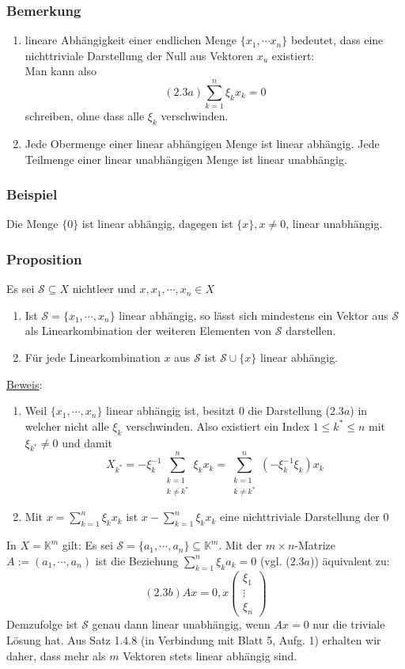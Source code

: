 \subsubsection{Bemerkung}
\renewcommand{\labelenumi}{(\arabic{enumi})}
\begin{enumerate}
\item lineare Abhängigkeit einer endlichen Menge $\{x_1,\cdots x_n\}$ bedeutet, dass eine nichttriviale Darstellung der Null aus Vektoren $x_u$ existiert:\\
Man kann also
\[(2.3a) \sum_{k=1}^n \xi _kx_k = 0\]
schreiben, ohne dass alle $\xi _k$ verschwinden.
\item Jede Obermenge einer linear abhängigen Menge ist linear abhängig.  Jede Teilmenge einer linear unabhängigen Menge ist linear unabhängig.
\end{enumerate}
\subsubsection{Beispiel}
Die Menge $\{0\}$ ist linear abhängig, dagegen ist $\{x\},x\not= 0$, linear unabhängig.
\subsubsection{Proposition}
Es sei $\mathcal{S}\subseteq X$ nichtleer und $x,x_1,\cdots ,x_n \in X$
\renewcommand{\labelenumi}{(\alph{enumi})}
\begin{enumerate}
\item Ist $\mathcal{S}=\{x_1, \cdots ,x_n\}$ linear abhängig, so lässt sich mindestens ein Vektor aus $\mathcal{S}$ als Linearkombination der weiteren Elementen von $\mathcal{S}$ darstellen.
\item Für jede Linearkombination $x$ aus $\mathcal{S}$ ist $\mathcal{S}\cup \{x\}$ linear abhängig.
\end{enumerate}
\underline{Beweis}:
\begin{enumerate}
\item Weil $\{x_1,\cdots ,x_n\}$ linear abhängig ist, besitzt $0$ die Darstellung ($2.3a$) in welcher nicht alle $\xi _k$ verschwinden.  Also existiert ein Index $1\leq k^*\leq n$ mit $\xi _{k^*} \not= 0$ und damit
\[X_{k^*} = -\xi _k^{-1} \sum_{\substack{k=1\\ k\not=k^*}}^n \xi _k x_k =\sum_{\substack{k=1\\ k\not=k^*}}^n (-\xi _k^{-1} \xi _k) x_k\]
\item Mit $x=\sum_{k=1}^n\xi _k x_k$ ist $x - \sum_{k=1}^n \xi _k x_k$ eine nichttriviale Darstellung der $0$
\end{enumerate}
In $X=\mathbb{K}^m$ gilt: Es sei $\mathcal{S}=\{a_1,\cdots ,a_n\}\subseteq \mathbb{K}^m$.  Mit der $m\times n$-Matrize $A:= (a_1,\cdots ,a_n)$ ist die Beziehung $\sum^n_{k=1} \xi _k a_k =0$ (vgl. ($2.3a$)) äquivalent zu:
\[ (2.3b) Ax=0, x\begin{pmatrix}\xi _1 \\ \vdots \\ \xi_n\end{pmatrix}\]
Demzufolge ist $\mathcal{S}$ genau dann linear unabhängig, wenn $Ax=0$ nur die triviale Lösung hat.  Aus Satz 1.4.8 (in Verbindung mit Blatt 5, Aufg. 1) erhalten wir daher, dass mehr als $m$ Vektoren stets linear abhängig sind.

